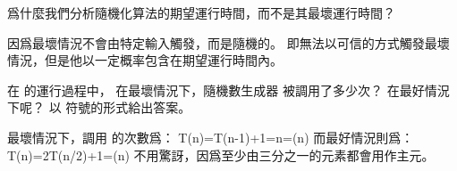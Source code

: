 \startsection[
  reference=section:rand_quicksort,
  title={A randomized version of quicksort},
]

\startEXERCISE
爲什麼我們分析隨機化算法的期望運行時間，而不是其最壞運行時間？
\stopEXERCISE

\startANSWER
因爲最壞情況不會由特定輸入觸發，而是隨機的。
即無法以可信的方式觸發最壞情況，但是他以一定概率包含在期望運行時間內。
\stopANSWER

\startEXERCISE
在  的運行過程中，
在最壞情況下，隨機數生成器  被調用了多少次？
在最好情況下呢？
以 \m{\Theta} 符號的形式給出答案。
\stopEXERCISE

\startANSWER
最壞情況下，調用  的次數爲：
\startformula
T(n)=T(n-1)+1=n=\Theta(n)
\stopformula
而最好情況則爲：
\startformula
T(n)=2T(n/2)+1=\Theta(n)
\stopformula
不用驚訝，因爲至少由三分之一的元素都會用作主元。
\stopANSWER

\stopsection
